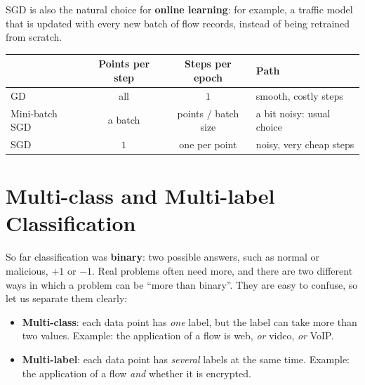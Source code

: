 SGD is also the natural choice for \textbf{online learning}: for example, a traffic model that is updated with every new batch of flow records, instead of being retrained from scratch.

\begin{center}
    \begin{tabular}{l|c|c|l}
        & \textbf{Points per step} & \textbf{Steps per epoch} & \textbf{Path} \\ \hline
        GD             & all     & $1$         & smooth, costly steps \\
        Mini-batch SGD & a batch & points / batch size & a bit noisy: usual choice \\
        SGD            & $1$     & one per point & noisy, very cheap steps \\
    \end{tabular}
\end{center}

\begin{center}
\end{center}

\section{Multi-class and Multi-label Classification}
So far classification was \textbf{binary}: two possible answers, such as normal or malicious, $+1$ or $-1$. Real problems often need more, and there are two different ways in which a problem can be ``more than binary''. They are easy to confuse, so let us separate them clearly:
\begin{itemize}
    \item \textbf{Multi-class}: each data point has \emph{one} label, but the label can take more than two values. Example: the application of a flow is web, \emph{or} video, \emph{or} VoIP.
    \item \textbf{Multi-label}: each data point has \emph{several} labels at the same time. Example: the application of a flow \emph{and} whether it is encrypted.
\end{itemize}

